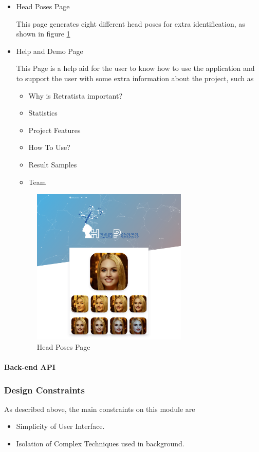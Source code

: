\begin{itemize}
    \item Head Poses Page
    
    This page generates eight different head poses for extra identification, as shown in figure \ref{fig:poses}
    
    \item Help and Demo Page 
    
    This Page is a help aid for the user to know how to use the application and to support the user with some extra information about the project, such as
    \begin{itemize}
        \item Why is Retratista important?
        \item Statistics
        \item Project Features
        \item How To Use?
        \item Result Samples
        \item Team
    \end{itemize}
    
    \begin{figure}[H]
        \centering
        \includegraphics[width=0.7\textwidth]{images/website/poses.png}
        \caption{Head Poses Page}
        \label{fig:poses}
    \end{figure}
    
\end{itemize}


\paragraph{Back-end API}


\subsubsection{Design Constraints}

As described above, the main constraints on this module are

\begin{itemize}
    \item Simplicity of User Interface.
    \item Isolation of Complex Techniques used in background.
\end{itemize}